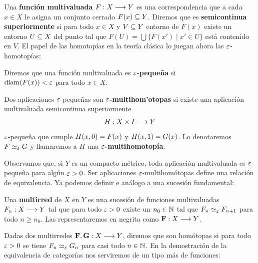 Una \textbf{función multivaluada} $ F:X\longrightarrow Y  $ es una correspondencia que a cada $ x\in X  $ le asigna un conjunto cerrado $ F(x)\subseteq Y  $. Diremos que es \textbf{semicontinua superiormente} si para todo $ x\in X  $ y $ V \subseteq Y $ entorno de $ F(x) $ existe un entorno $ U\subseteq X  $ del punto tal que $ F(U) = \bigcup \{F(x')\mid x'\in U \} $ está contenido en $ V  $. El papel de las homotopías en la teoría clásica lo juegan ahora las $ \varepsilon $-homotopías:
\begin{definition}
  Diremos que una función multivaluada es $ \varepsilon  $-\textbf{peque\~ na} si \\ $ \operatorname{diam}(F(x))<\varepsilon  $ para todo $ x\in X  $. 

  Dos aplicaciones $ \varepsilon $-peque\~ nas son $ \varepsilon  $\textbf{-multihom'otopas} si existe una aplicación multivaluada semicontinua superiormente  
  \begin{gather*}
    H:X\times I\longrightarrow Y 
  \end{gather*}
  $ \varepsilon  $-peque\~ na que cumple $ H(x,0) = F(x)  $ y $ H(x,1) = G(x)  $. Lo denotaremos $ F\simeq_\varepsilon G  $ y llamaremos a $ H  $ una $ \varepsilon  $\textbf{-multihomotopía}.   
\end{definition}
Observamos que, si $ Y  $ es un compacto métrico, toda aplicación multivaluada es $ \varepsilon  $-peque\~na para algún $ \varepsilon>0  $. Ser aplicaciones $ \varepsilon  $-multihomótopas define una relación de equivalencia. Ya podemos definir e análogo a una sucesión fundamental:
\begin{definition}
  Una \textbf{multirred} de $ X  $ en $ Y  $ es una sucesión de funciones multivaluadas $ F_n:X\longrightarrow Y  $ tal que para todo $ \varepsilon>0  $ existe un $ n_0\in \mathbb{N}  $ tal que $ F_n \simeq_\varepsilon F_{n+1} $ para todo $ n\geq n_0  $. Las representaremos en negrita como $ \mathbf{F}:X\longrightarrow Y  $.
\end{definition}
Dadas dos multirredes $ \mathbf{F},\mathbf{G}:X\longrightarrow Y  $, diremos que son homótopas si para todo $ \varepsilon>0  $ se tiene $ F_n\simeq_\varepsilon G_n  $ para casi todo $ n \in \mathbb{N}  $. En la demostración de la equivalencia de categorías nos serviremos de un tipo más de funciones:



